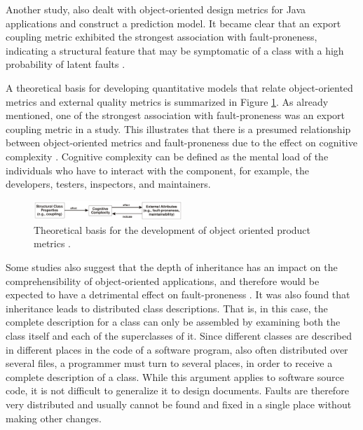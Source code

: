 Another study, also dealt with object-oriented design metrics for Java applications and construct a prediction model. It became clear that an export coupling metric exhibited the strongest association with fault-proneness, indicating a structural feature that may be symptomatic of a class with a high probability of latent faults \cite{b10el2001prediction}.

A theoretical basis for developing quantitative models that relate object-oriented metrics and external quality metrics is summarized in Figure \ref{figCoupling}. As already mentioned, one of the strongest association with fault-proneness was an export coupling metric in a study. This illustrates that there is a presumed relationship between object-oriented metrics and fault-proneness due to the effect on cognitive complexity \cite{b10el2001prediction}. Cognitive complexity can be defined as the mental load of the individuals who have to interact with the component, for example, the developers, testers, inspectors, and maintainers. 

\begin{figure}[htbp]
	\centerline{\includegraphics[width=0.5\textwidth]{pictures/faultyclasses1.png}}
	\caption{Theoretical basis for the development of object oriented product metrics \cite{b10el2001prediction}.}
	\label{figCoupling}
\end{figure}

Some studies also suggest that the depth of inheritance has an impact on the comprehensibility of object-oriented applications, and therefore would be expected to have a detrimental effect on fault-proneness \cite{b10el2001prediction}.
It was also found that inheritance leads to distributed class descriptions. That is, in this case, the complete description for a class can only be assembled by examining both the class itself and each of the superclasses of it.
Since different classes are described in different places in the code of a software program, also often distributed over several files, a programmer must turn to several places, in order to receive a complete description of a class. While this argument applies to software source code, it is not difficult to generalize it to design documents. Faults are therefore very distributed and usually cannot be found and fixed in a single place without making other changes.

